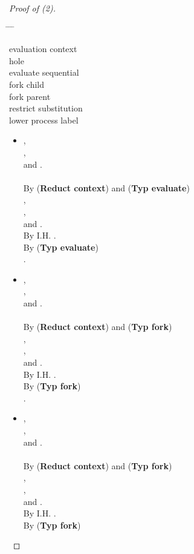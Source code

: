 \documentclass{sigplanconf}
\newenvironment{defn2}{\begin{tabbing}
  \hspace{1.5em} \= \hspace{.295\linewidth - 1.5em} \= \hspace{1.5em} \= \kill
  }{
  \end{tabbing}}
\newcommand{\entry}[2]{\>\>\>#2}
\newcommand{\clause}[2]{\>\>#2}
\newcommand{\mycategory}[2]{\clause{#1::=}{#2}}
\newcommand{\lab}{\mathsf L}
\newcommand{\new}[2]{(\nu #1)\:#2}
\newcommand{\fork}[2]{#1\Rsh\:\!#2}
\newcommand{\eval}[3]{\mathsf{let}~#1=#2~\mathsf{in}~#3}
\newcommand{\trule}[1]{(\textbf{Typ #1})}
\newcommand{\rrule}[1]{\textbf{Reduct #1}}
\begin{document}
\begin{proof}[Proof of (2)]
\begin{defn2}
\mycategory{\mathcal E_{\lab;\sigma}}{evaluation context} \\
\entry{\bullet_{\lab;\sigma}}{hole} \\
\entry{\eval x {\mathcal E_{\lab;\sigma}} b}{evaluate sequential} \\
\entry{\fork{\mathcal E_{\lab;\sigma}} b}{fork child} \\
\entry{\fork a \mathcal E_{\lab;\sigma}}{fork parent} \\
\entry{\new {x/\mu @\lab'} \mathcal E_{\lab,\{x/\mu@\lab'\}\cup \sigma}}{restrict substitution} \\
\entry{[\lab']~\mathcal E_{\lab';\sigma}~~~~~(\lab' \sqsubseteq \lab)}{lower process label}
\end{defn2}
\begin{itemize}
\item ,\\
 ,\\
 and .\\
\\
By (\rrule{context}) and \trule{evaluate} \\
 ,\\
 , \\
 and .\\
By I.H. .\\
By \trule{evaluate} \\
 .\\
\item ,\\
 ,\\
 and .\\
\\
By (\rrule{context}) and \trule{fork} \\
 ,\\
 , \\
 and .\\
By I.H. .\\
By \trule{fork} \\
 .\\
\item ,\\
 ,\\
 and .\\
\\
By (\rrule{context}) and \trule{fork} \\
 ,\\
 , \\
 and .\\
By I.H. .\\
By \trule{fork} \\

\end{itemize}
\end{proof}
\end{document}
